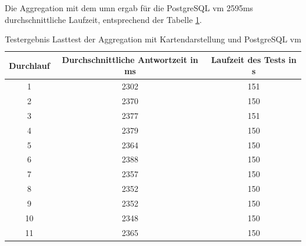 Die Aggregation mit dem \Gls{umn} ergab für die PostgreSQL \Gls{vm} 2595ms durchschnittliche Laufzeit, entsprechend der Tabelle \ref{tbl:ergebnisseTest1PG_UMN}.
\begin{table}[h!]
\centering
\begin{tabular}{c|c|c}
\textbf{Durchlauf} & \textbf{Durchschnittliche Antwortzeit in ms} & \textbf{Laufzeit des Tests in s} \\ \hline
1 & 2302 & 151 \\ \hline
2 & 2370 & 150 \\ \hline
3 & 2377 & 151 \\ \hline
4 & 2379 & 150 \\ \hline
5 & 2364 & 150 \\ \hline 
6 & 2388 & 150 \\ \hline
7 & 2357 & 150 \\ \hline
8 & 2352 & 150 \\ \hline
9 & 2352 & 150 \\ \hline 
10 & 2348 & 150 \\ \hline
11 & 2365 & 150 \\	
\end{tabular}
\caption[Testergebnis Lasttest der Aggregation mit Kartendarstellung und PostgreSQL \Gls{vm}]{Testergebnis Lasttest der Aggregation mit Kartendarstellung und PostgreSQL \Gls{vm}}
\label{tbl:ergebnisseTest1PG_UMN}
\end{table}


